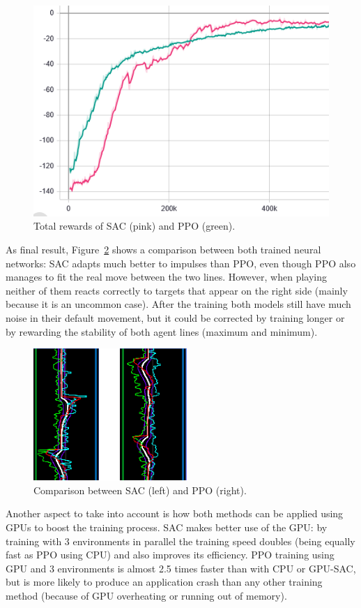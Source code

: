 \begin{figure}[h]
  \centering
		\includegraphics[width=.6\textwidth]{img/PpoSac.png}
  \caption{Total rewards of SAC (pink) and PPO (green).}
  \label{fig:pposac}
\end{figure}

As final result, Figure~\ref{fig:graphPS} shows a comparison between both trained neural networks: SAC adapts much better to impulses than PPO, even though PPO also manages to fit the real move between the two lines. However, when playing neither of them reacts correctly to targets that appear on the right side (mainly because it is an uncommon case). After the training both models still have much noise in their default movement, but it could be corrected by training longer or by rewarding the stability of both agent lines (maximum and minimum).

\begin{figure}[h]
  \centering
		\includegraphics[width=.6\textwidth]{img/graphSacPpo.png}
  \caption{Comparison between SAC (left) and PPO (right).}
  \label{fig:graphPS}
\end{figure}

Another aspect to take into account is how both methods can be applied using GPUs to boost the training process. SAC makes better use of the GPU: by training with 3 environments in parallel the training speed doubles (being equally fast as PPO using CPU) and also improves its efficiency. PPO training using GPU and 3 environments is almost 2.5 times faster than with CPU or GPU-SAC, but is more likely to produce an application crash than any other training method (because of GPU overheating or running out of memory).

